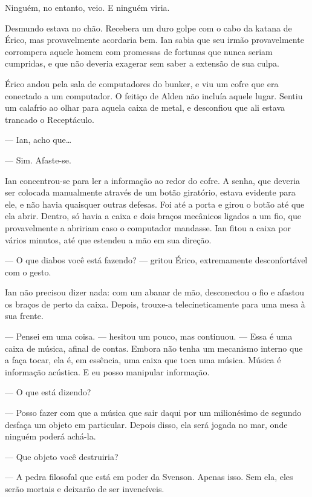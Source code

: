 Ninguém, no entanto, veio. E ninguém viria.

\espaco


Desmundo estava no chão. Recebera um duro golpe com o cabo da katana de
Érico, mas provavelmente acordaria bem. Ian sabia que seu irmão
provavelmente corrompera aquele homem com promessas de fortunas que
nunca seriam cumpridas, e que não deveria exagerar sem saber a extensão
de sua culpa.

Érico andou pela sala de computadores do bunker, e viu um cofre que era
conectado a um computador. O feitiço de Alden não incluía aquele lugar.
Sentiu um calafrio ao olhar para aquela caixa de metal, e desconfiou que
ali estava trancado o Receptáculo.

--- Ian, acho que\ldots

--- Sim. Afaste-se.

Ian concentrou-se para ler a informação ao redor do cofre. A senha, que
deveria ser colocada manualmente através de um botão giratório, estava
evidente para ele, e não havia quaisquer outras defesas. Foi até a porta
e girou o botão até que ela abrir. Dentro, só havia a caixa e dois
braços mecânicos ligados a um fio, que provavelmente a abririam caso o
computador mandasse. Ian fitou a caixa por vários minutos, até que
estendeu a mão em sua direção.

--- O que diabos você está fazendo? --- gritou Érico, extremamente
desconfortável com o gesto.

Ian não precisou dizer nada: com um abanar de mão, desconectou o fio e
afastou os braços de perto da caixa. Depois, trouxe-a telecineticamente
para uma mesa à sua frente.

--- Pensei em uma coisa. --- hesitou um pouco, mas continuou. --- Essa é
uma caixa de música, afinal de contas. Embora não tenha um mecanismo
interno que a faça tocar, ela é, em essência, uma caixa que toca uma
música. Música é informação acústica. E eu posso manipular informação.

--- O que está dizendo?

--- Posso fazer com que a música que sair daqui por um milionésimo de
segundo desfaça um objeto em particular. Depois disso, ela será jogada
no mar, onde ninguém poderá achá-la.

--- Que objeto você destruiria?

--- A pedra filosofal que está em poder da Svenson. Apenas isso. Sem
ela, eles serão mortais e deixarão de ser invencíveis.

